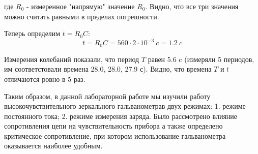 \documentclass[14pt]{article}
\begin{document}
где $R_0$ - измеренное "напрямую" значение $R_0$. Видно, что все три значения можно считать равными в пределах погрешности.

\vspace{1cm}
Теперь определим $t = R_0C$:
$$
	t = R_0C = 560\cdot2\cdot10^{-3}~c = 1.2~c
$$

Измерения колебаний показали, что период $T$ равен 5.6 c (измеряли 5 периодов, им соответстовали времена 28.0, 28.0, 27.9 с). Видно, что времена $T$ и $t$ отличаются ровно в 5 раз.

\newpage
Таким образом, в данной лабораторной работе мы изучили работу высокочувствительного зеркального гальванометрав двух режимах: 1. режиме постоянного тока; 2. режиме измерения заряда. Было рассмотрено влияние сопротивления цепи на чувствительность прибора а также определено критическое сопротивление, при котором использование гальванометра оказывается наиболее удобным.
\end{document}
